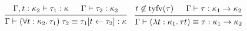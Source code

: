 \documentclass[lualatex,12pt,unicode]{article}
\begin{document}
\[
    \begin{prooftree}
        \hypo{\Gamma, t: \kappa_2 \vdash \tau_1: \kappa}
        \hypo{\Gamma \vdash \tau_2: \kappa_2}
        \infer2{\Gamma \vdash (\forall t: \kappa_2\ldotp \tau_1)\; \tau_2 \equiv \tau_1[t \leftarrow \tau_2]: \kappa}
    \end{prooftree}
    \hspace{1em}
    \begin{prooftree}
        \hypo{t \not\in \mathrm{tyfv}(\tau)}
        \hypo{\Gamma \vdash \tau: \kappa_1 \to \kappa_2}
        \infer2{\Gamma \vdash (\lambda t: \kappa_1\ldotp \tau t) \equiv \tau: \kappa_1 \to \kappa_2}
    \end{prooftree}
\]
\end{document}
